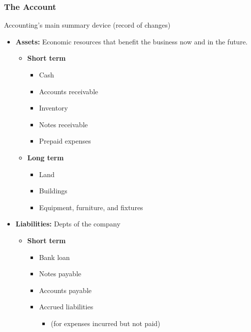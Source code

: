 \subsubsection{The Account}
\begin{definition}
    Accounting's main summary device (record of changes)
    \begin{itemize}
        \item \textbf{Assets:} Economic resources that benefit the business now and in the future. 
        \begin{itemize}
            \item \textbf{Short term}
            \begin{itemize}
                \item Cash
                \item Accounts receivable
                \item Inventory
                \item Notes receivable
                \item Prepaid expenses
            \end{itemize}
            
            \item \textbf{Long term}
            \begin{itemize}
                \item Land
                \item Buildings
                \item Equipment, furniture, and fixtures
            \end{itemize}
        \end{itemize}
        \item \textbf{Liabilities:} Depts of the company
        \begin{itemize}
            \item \textbf{Short term}
            \begin{itemize}
                \item Bank loan
                \item Notes payable
                \item Accounts payable
                \item Accrued liabilities
                \begin{itemize}
                    \item (for expenses incurred but not paid)
                \end{itemize}
            \end{itemize}
            

\end{itemize}
\end{itemize}
\end{definition}
